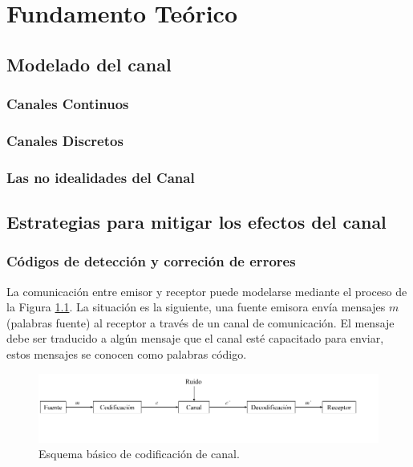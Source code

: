 \chapter{Fundamento Teórico}

\section{Modelado del canal}
	\subsection{Canales Continuos}
	\subsection{Canales Discretos}
	\subsection{Las no idealidades del Canal}


\section{Estrategias para mitigar los efectos del canal}

	\subsection{C\'odigos de detecci\'on y correci\'on de errores}

La comunicación entre emisor y receptor puede modelarse mediante el proceso de la Figura \ref{diagrama_codificacion}. La situación es la siguiente, una fuente emisora envía mensajes $m$ (palabras fuente) al receptor a través de un canal de comunicación. El mensaje debe ser traducido a algún mensaje que el canal esté capacitado para enviar, estos mensajes se conocen como palabras código.

\begin{figure}
\centering
\includegraphics[scale=0.45]{figuras/cap02/diagrama_codificacion}
\caption{\label{diagrama_codificacion} Esquema básico de codificación de canal.}
\end{figure}

